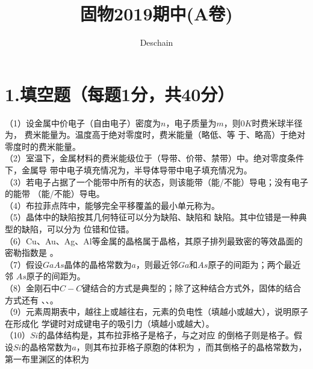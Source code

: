 \documentclass[UTF8]{ctexart}
\title{固物2019期中(A卷)}
\author{Deschain}
\begin{document}
\maketitle
\section*{\bfseries 1.填空题（每题1分，共40分）}
（1）设金属中价电子（自由电子）密度为$n$，电子质量为$m$，则$0K$时费米球半径为\uline{\makebox[6em]{}}，
费米能量为\uline{\makebox[8em]{}}。温度高于绝对零度时，费米能量\uline{\makebox[4em]{}}（略低、等
于、略高）于绝对零度时的费米能量。\\
（2）室温下，金属材料的费米能级位于\uline{\makebox[4em]{}}（导带、价带、禁带）中。绝对零度条件下，金属导
带中电子填充情况为\uline{\makebox[6em]{}}，半导体导带中电子填充情况为\uline{\makebox[6em]{}}。\\
（3）若电子占据了一个能带中所有的状态，则该能带\uline{\makebox[3em]{}}（能/不能）导电；没有电子的能带
\uline{\makebox[3em]{}}（能/不能）导电。\\
（4）布拉菲点阵中，能够完全平移覆盖的最小单元称为\uline{\makebox[3em]{}}。\\
（5）晶体中的缺陷按其几何特征可以分为\uline{\makebox[2em]{}}缺陷、\uline{\makebox[2em]{}}缺陷和
\uline{\makebox[2em]{}}缺陷。其中位错是一种典型的\uline{\makebox[2em]{}}缺陷，可以分为
\uline{\makebox[3em]{}}位错和\uline{\makebox[3em]{}}位错。\\
（6）Cu、Au、Ag、Al等金属的晶格属于\uline{\makebox[6em]{}}晶格，其原子排列最致密的等效晶面的密勒指数是
\uline{\makebox[4em]{}}。\\
（7）假设$GaAs$晶体的晶格常数为$a$，则最近邻$Ga$和$As$原子的间距为\uline{\makebox[3em]{}}；两个最近邻
$As$原子的间距为\uline{\makebox[6em]{}}。\\
（8）金刚石中$C-C$键结合的方式是典型的\uline{\makebox[6em]{}}；除了这种结合方式外，固体的结合方式还有
\uline{\makebox[6em]{}}、\uline{\makebox[6em]{}}、\uline{\makebox[9em]{}}。\\
（9）元素周期表中，越往上或越往右，元素的负电性\uline{\makebox[3em]{}}（填越小或越大），说明原子在形成化
学键时对成键电子的吸引力\uline{\makebox[3em]{}}（填越小或越大）。\\
（10）$Si$的晶体结构是\uline{\makebox[4em]{}}，其布拉菲格子是\uline{\makebox[6em]{}}格子，与之对应
的倒格子则是\uline{\makebox[6em]{}}格子。假设$Si$的晶格常数为$a$，则其布拉菲格子原胞的体积为
\uline{\makebox[3em]{}}，而其倒格子的晶格常数为\uline{\makebox[3em]{}}，第一布里渊区的体积为
\uline{\makebox[3em]{}}\\
\end{document}
